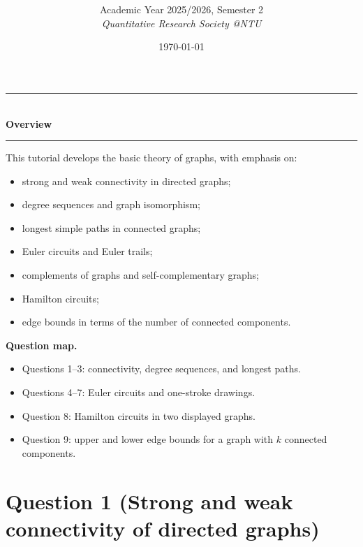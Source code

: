 \documentclass[12pt]{article}
\title{
\CourseCode \CourseName \\[0.3em]
\large \DocType
}
\author{
  Academic Year 2025/2026, Semester 2 \\[0.25em]
  \textit{Quantitative Research Society @NTU}
}
\date{\today}
\begin{document}
\maketitle
\thispagestyle{plainfirst}
\pagestyle{main}

\begin{center}
  \rule{0.82\textwidth}{0.4pt}\\[4pt]
  \textbf{Overview}\\[2pt]
  \rule{0.82\textwidth}{0.4pt}
\end{center}

\noindent
This tutorial develops the basic theory of graphs, with emphasis on:
\begin{itemize}[leftmargin=*]
  \item strong and weak connectivity in directed graphs;
  \item degree sequences and graph isomorphism;
  \item longest simple paths in connected graphs;
  \item Euler circuits and Euler trails;
  \item complements of graphs and self-complementary graphs;
  \item Hamilton circuits;
  \item edge bounds in terms of the number of connected components.
\end{itemize}

\noindent
\textbf{Question map.}
\begin{itemize}[leftmargin=*]
  \item Questions 1--3: connectivity, degree sequences, and longest paths.
  \item Questions 4--7: Euler circuits and one-stroke drawings.
  \item Question 8: Hamilton circuits in two displayed graphs.
  \item Question 9: upper and lower edge bounds for a graph with \(k\) connected components.
\end{itemize}

\newpage
\tableofcontents
\newpage

\section{Question 1 (Strong and weak connectivity of directed graphs)}
\end{document}

